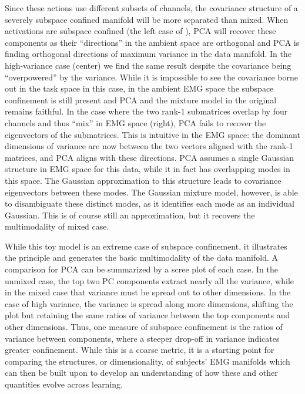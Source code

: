 \documentclass[../main.tex]{subfiles}
\begin{document}
Since these actions use different subsets of channels, the covariance structure of a severely subspace confined manifold will be more separated than mixed. When activations are subspace confined (the left case of ), PCA will recover these components as their ``directions'' in the ambient space are orthogonal and PCA is finding orthogonal directions of maximum variance in the data manifold. In the high-variance case (center) we find the same result despite the covariance being ``overpowered'' by the variance. While it is impossible to see the covariance borne out in the task space in this case, in the ambient EMG space the subspace confinement is still present and PCA and the mixture model in the original remains faithful. In the case where the two rank-1 submatrices overlap by four channels and thus ``mix'' in EMG space (right), PCA fails to recover the eigenvectors of the submatrices. This is intuitive in the EMG space: the dominant dimensions of variance are now between the two vectors aligned with the rank-1 matrices, and PCA aligns with these directions. PCA assumes a single Gaussian structure in EMG space for this data, while it in fact has overlapping modes in this space. The Gaussian approximation to this structure leads to covariance eigenvectors between these modes. The Gaussian mixture model, however, is able to disambiguate these distinct modes, as it identifies each mode as an individual Gaussian. This is of course still an approximation, but it recovers the multimodality of mixed case.

While this toy model is an extreme case of subspace confinement, it illustrates the principle and generates the basic multimodality of the data manifold. A comparison for PCA can be summarized by a scree plot of each case. In the unmixed case, the top two PC components extract nearly all the variance, while in the mixed case that variance must be spread out to other dimensions. In the case of high variance, the variance is spread along more dimensions, shifting the plot but retaining the same ratios of variance between the top components and other dimensions. Thus, one measure of subspace confinement is the ratios of variance between components, where a steeper drop-off in variance indicates greater confinement. While this is a coarse metric, it is a starting point for comparing the structures, or dimensionality, of subjects' EMG manifolds which can then be built upon to develop an understanding of how these and other quantities evolve across learning.

\end{document}
